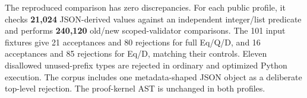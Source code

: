 The reproduced comparison has zero discrepancies. For each public profile, it checks \textbf{21,024} JSON-derived values against an independent integer/list predicate and performs \textbf{240,120} old/new scoped-validator comparisons. The 101 input fixtures give 21 acceptances and 80 rejections for full Eq/Q/D, and 16 acceptances and 85 rejections for Eq/D, matching their controls. Eleven disallowed unused-prefix types are rejected in ordinary and optimized Python execution. The corpus includes one metadata-shaped JSON object as a deliberate top-level rejection. The proof-kernel AST is unchanged in both profiles.
